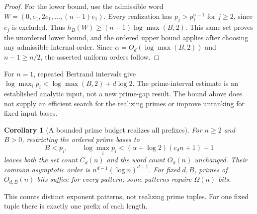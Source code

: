 \documentclass[11pt,a4paper]{article}
\newtheorem{corollary}[theorem]{Corollary}
\theoremstyle{remark}
\begin{document}
\begin{proof}
For the lower bound, use the admissible word
\(W=(0,e_1,2e_1,\ldots,(n-1)e_1)\).
Every realization has \(p_j>p_1^{n-1}\) for \(j\geq2\), since
\(e_j\) is excluded. Thus
\(h_B(W)\geq(n-1)\log\max(B,2)\).
This same set proves the unordered lower bound, and the ordered upper
bound applies after choosing any admissible internal order.
Since \(\alpha=O_d(\log\max(B,2))\) and \(n-1\geq n/2\), the
asserted uniform orders follow.
\end{proof}

For \(n=1\), repeated Bertrand intervals give
\(\log\max_i p_i<\log\max(B,2)+d\log2\).
The prime-interval estimate is an established analytic input, not a new
prime-gap result. The bound above does not supply an efficient search
for the realizing primes or improve unranking for fixed input bases.

\begin{corollary}[A bounded prime budget realizes all prefixes]\label{cor:budget}
For \(n\geq2\) and \(B>0\), restricting the ordered prime bases to
\[
 B<p_i,\qquad
 \log\max_i p_i<(\alpha+\log2)(c_dn+1)+1
\]
leaves both the set count \(C_d(n)\) and the word count \(O_d(n)\)
unchanged. Their common asymptotic order is
\(n^{d-1}(\log n)^{d-1}\). For fixed \(d,B\), primes of
\(O_{d,B}(n)\) bits suffice for every pattern; some patterns require
\(\Omega(n)\) bits.
\end{corollary}
This counts distinct exponent patterns, not realizing prime tuples.
For one fixed tuple there is exactly one prefix of each length.
\end{document}
